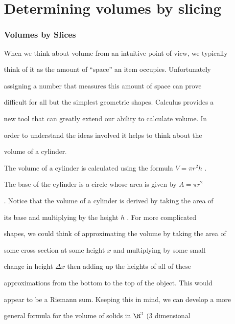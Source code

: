 \section{Determining volumes by slicing}
\label{sec:dete-b39e}


\subsubsection{Volumes by Slices}
\label{sss:volu-7c52}


When we think about volume from an intuitive point of view, we typically

think of it as the amount of ``space'' an item occupies. Unfortunately

assigning a number that measures this amount of space can prove

difficult for all but the simplest geometric shapes. Calculus provides a

new tool that can greatly extend our ability to calculate volume. In

order to understand the ideas involved it helps to think about the

volume of a cylinder.


The volume of a cylinder is calculated using the formula $V=\pi r^2h$ .

The base of the cylinder is a circle whose area is given by $A=\pi r^2$

. Notice that the volume of a cylinder is derived by taking the area of

its base and multiplying by the height $h$ . For more complicated

shapes, we could think of approximating the volume by taking the area of

some cross section at some height $x$ and multiplying by some small

change in height $\Delta x$ then adding up the heights of all of these

approximations from the bottom to the top of the object. This would

appear to be a Riemann sum. Keeping this in mind, we can develop a more

general formula for the volume of solids in $\R^3$ (3 dimensional

